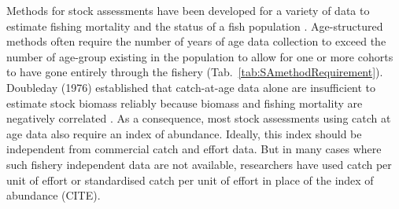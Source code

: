 Methods for stock assessments have been developed for a variety of data to estimate fishing mortality and the status of a fish population \citep{DowP2007}. Age-structured methods often require the number of years of age data collection to exceed the number of age-group existing in the population to allow for one or more cohorts to have gone entirely through the fishery (Tab.~\ref{tab:SAmethodRequirement}).\\

Doubleday (1976) established that catch-at-age data alone are insufficient to estimate stock biomass reliably because biomass and fishing mortality are negatively correlated \citep{Maunder201361}. As a consequence, most stock assessments using catch at age data also require an index of abundance. Ideally, this index should be independent from commercial catch and effort data. But in many cases where such fishery independent data are not available, researchers have used catch per unit of effort or standardised catch per unit of effort in place of the index of abundance (CITE).\\ 
